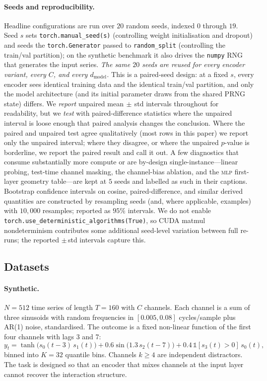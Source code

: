 \documentclass[11pt]{article}
\begin{document}
\paragraph{Seeds and reproducibility.}
Headline configurations are run over $20$ random seeds, indexed $0$
through $19$. Seed $s$ sets \texttt{torch.manual\_seed(s)}
(controlling weight initialisation and dropout) and seeds the
\texttt{torch.Generator} passed to \texttt{random\_split}
(controlling the train/val partition); on the synthetic benchmark
it also drives the \texttt{numpy} RNG that generates the input
series. \emph{The same $20$ seeds are reused for every encoder
variant, every $C$, and every $d_{\text{model}}$.} This is a
paired-seed design: at a fixed $s$, every encoder sees identical
training data and the identical train/val partition, and only the
model architecture (and its initial parameter draws from the shared
PRNG state) differs. We \emph{report} unpaired mean$\,\pm\,$std
intervals throughout for readability, but we \emph{test} with
paired-difference statistics where the unpaired interval is loose
enough that paired analysis changes the conclusion. Where the
paired and unpaired test agree qualitatively (most rows in this
paper) we report only the unpaired interval; where they disagree,
or where the unpaired $p$-value is borderline, we report the paired
result and call it out. A few diagnostics that consume substantially
more compute or are by-design single-instance---linear probing,
test-time channel masking, the channel-bias ablation, and the
\textsc{mlp} first-layer geometry table---are kept at $5$ seeds and
labelled as such in their captions. Bootstrap confidence intervals
on cosine, paired-difference, and similar derived quantities are
constructed by resampling seeds (and, where applicable, examples)
with $10{,}000$ resamples; reported as $95\%$ intervals. We do not
enable \texttt{torch.use\_deterministic\_algorithms(True)}, so CUDA
matmul nondeterminism contributes some additional seed-level
variation between full re-runs; the reported $\pm\,$std intervals
capture this.

\subsection{Datasets}

\paragraph{Synthetic.} $N{=}512$ time series of length $T{=}160$ with
$C$ channels. Each channel is a sum of three sinusoids with random
frequencies in $[0.005, 0.08]$ cycles/sample plus AR(1) noise,
standardised. The outcome is a fixed non-linear function of the first
four channels with lags 3 and 7:
\[
y_t = \tanh\!\big(s_0(t{-}3)\,s_1(t)\big)
    + 0.6\sin\!\big(1.3\,s_2(t{-}7)\big)
    + 0.4\,\mathbb{1}[s_3(t)>0]\,s_0(t),
\]
binned into $K{=}32$ quantile bins. Channels $k \ge 4$ are independent
distractors. The task is designed so that an encoder that mixes channels
at the input layer cannot recover the interaction structure.
\end{document}
